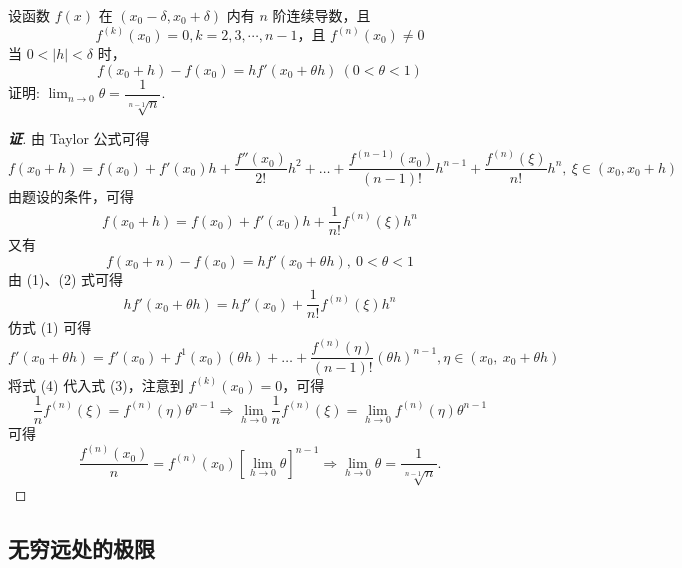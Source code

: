 \begin{example}
    设函数 $f(x)$ 在 $(x_0-\delta,x_0+\delta)$ 内有 $n$ 阶连续导数，且
    $$f^{(k)}(x_0)=0,k=2,3,\cdots,n-1\text{，且 }f^{(n)}(x_0)\neq 0$$
    当 $0<|h|<\delta$ 时，
    $$f(x_0+h)  -f(x_0)  =hf'(x_{0}+\theta h)  ~ ( 0 <\theta  < 1) $$
    证明: $\displaystyle \lim _{n\rightarrow 0}\theta =\dfrac{1}{\sqrt[n-1] {n}}.$
\end{example}
\begin{proof}[{\songti \textbf{证}}]
    由 Taylor 公式可得
    $$f(x_0+h)  =f(x_0)  +f'(x_0)  h+\dfrac{f''(x_0)  }{2!}h^{2}+\ldots +\dfrac{f^{\left( n-1\right) }(x_0)  }{\left( n-1\right) !}h^{n-1}+\dfrac{f^{(n) }(\xi ) }{n!}h^{n},~\xi\in(x_0,x_0+h)$$
    由题设的条件，可得
    \begin{equation}
        f(x_0+h)  =f(x_0)  +f'(x_0)  h+\dfrac{1}{n!}f^{(n) }(\xi ) h^{n}\tag{1}
    \end{equation}
    又有
    \begin{equation}
        f\left( x_{0}+n\right) -f(x_0)  =hf'(x_{0}+\theta h)  ,~0 <\theta  <1 \tag{2}
    \end{equation}
    由 (1)、(2) 式可得
    \begin{equation}
        hf'(x_{0}+\theta h)  =hf'(x_0)  +\dfrac{1}{n!}f^{(n) }(\xi ) h^{n}\tag{3}
    \end{equation}
    仿式 (1) 可得
    \begin{equation}
        f'(x_{0}+\theta h)  =f'(x_0)  +f^{1}(x_0)  \left( \theta h\right) +\ldots +\dfrac{f^{(n) }\left( \eta \right) }{\left( n-1\right) !}\left( \theta h\right) ^{n-1},\eta \in \left( x_{0},~x_{0}+\theta h\right) \tag{4}
    \end{equation}
    将式 (4) 代入式 (3)，注意到 $f^{(k)}(x_0)=0$，可得
    $$\dfrac{1}{n}f^{(n)}(\xi)=f^{(n)}(\eta)\theta^{n-1}\Rightarrow \lim_{h\to0}\dfrac{1}{n}f^{(n)}(\xi)=\lim_{h\to0}f^{(n)}(\eta) \theta^{n-1}$$
    可得 $$\dfrac{f^{(n)}(x_0)}{n}=f^{(n)}(x_0)\left[\lim_{h\to0}\theta\right]^{n-1}\Rightarrow \lim_{h\to0}\theta=\dfrac{1}{\sqrt[n-1]{n}}.$$
\end{proof}

\subsection{无穷远处的极限}


